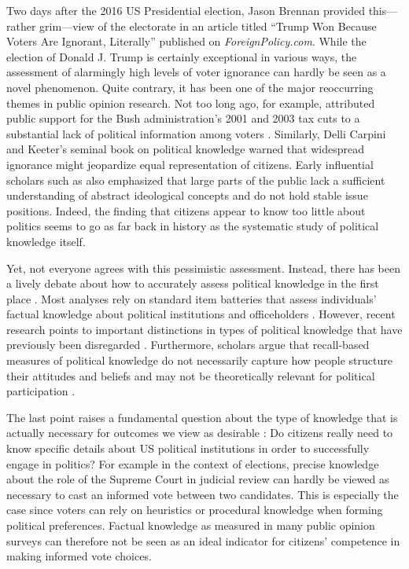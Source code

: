 \documentclass[12pt]{article}
\begin{document}
Two days after the 2016 US Presidential election, Jason Brennan provided this--- rather grim---view of the electorate in an article titled ``Trump Won Because Voters Are Ignorant, Literally'' published on \textit{ForeignPolicy.com}. While the election of Donald J. Trump is certainly exceptional in various ways, the assessment of alarmingly high levels of voter ignorance can hardly be seen as a novel phenomenon. Quite contrary, it has been one of the major reoccurring themes in public opinion research. Not too long ago, for example, \citet{bartels2005homer} attributed public support for the Bush administration's 2001 and 2003 tax cuts to a substantial lack of political information among voters \citep[but see][]{lupia2007were,bartels2007homer}. Similarly, Delli Carpini and Keeter's \citeyearpar{carpini1996americans} seminal book on political knowledge warned that widespread ignorance might jeopardize equal representation of citizens. Early influential scholars such as \citet{converse1964nature} also emphasized that large parts of the public lack a sufficient understanding of abstract ideological concepts and do not hold stable issue positions. Indeed, the finding that citizens appear to know too little about politics seems to go as far back in history as the systematic study of political knowledge itself.

Yet, not everyone agrees with this pessimistic assessment. Instead, there has been a lively debate about how to accurately assess political knowledge in the first place \citep[e.g.][]{mondak2000reconsidering,mondak2001asked,sturgis2008experiment,debell2013harder,pietryka2013analysis}. Most analyses rely on standard item batteries that assess individuals' factual knowledge about political institutions and officeholders \citep[e.g.,][]{carpini1996americans}. However, recent research points to important distinctions in types of political knowledge that have previously been disregarded \citep{barabas2014question}. Furthermore, scholars argue that recall-based measures of political knowledge do not necessarily capture how people structure their attitudes and beliefs \citep[e.g.][]{luskin1987measuring} and may not be theoretically relevant for political participation \citep{lupia2006elitism}.

The last point raises a fundamental question about the type of knowledge that is actually necessary for outcomes we view as desirable \citep[see also][]{lupia2015uninformed}: Do citizens really need to know specific details about US political institutions in order to successfully engage in politics? For example in the context of elections, precise knowledge about the role of the Supreme Court in judicial review can hardly be viewed as necessary to cast an informed vote between two candidates. This is especially the case since voters can rely on heuristics \citep{lupia1994shortcuts} or procedural knowledge \citep{prior2008money} when forming political preferences. Factual knowledge as measured in many public opinion surveys can therefore not be seen as an ideal indicator for citizens' competence in making informed vote choices.
\end{document}

